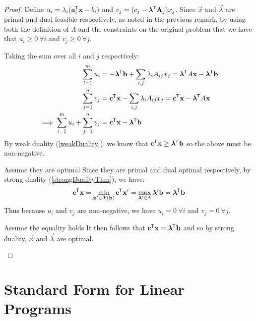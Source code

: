 \documentclass[../main.tex]{subfiles}
\begin{document}
\begin{proof}
  Define $u_i = \lambda_i(\mathbf{\bm{a}}^{{\mkern-1.5mu\mathsf{T}}}_i \mathbf{\bm{x}} - b_i)$ and $v_j = (c_j - \mathbf{\bm{\lambda}}^{{\mkern-1.5mu\mathsf{T}}} \mathbf{\bm{A}}_j)x_j$.
  Since $\vec{x}$ and $\vec{\lambda}$ are primal and dual feasible respectively, as noted in the previous remark, by using both the definition of $\Lambda$ and the constraints on the original problem that we have that $u_i \geq 0\ \forall i$ and $v_j \geq 0\ \forall j$.

  Taking the sum over all $i$ and $j$ respectively:
  \begin{align*}
    \sum_{i = 1}^{m} u_i &= - \mathbf{\bm{\lambda}}^{{\mkern-1.5mu\mathsf{T}}} \mathbf{\bm{b}} + \sum_{i, j} \lambda_i A_{i j} x_j  = \mathbf{\bm{\lambda}}^{{\mkern-1.5mu\mathsf{T}}} A \mathbf{\bm{x}} - \mathbf{\bm{\lambda}}^{{\mkern-1.5mu\mathsf{T}}} \mathbf{\bm{b}} \\
    \sum_{j = 1}^{n} v_j &= \mathbf{\bm{c}}^{{\mkern-1.5mu\mathsf{T}}} \mathbf{\bm{x}} - \sum_{i, j} \lambda_i A_{i j} x_j = \mathbf{\bm{c}}^{{\mkern-1.5mu\mathsf{T}}} \mathbf{\bm{x}} - \mathbf{\bm{\lambda}}^{{\mkern-1.5mu\mathsf{T}}} A\mathbf{\bm{x}} \\
    \implies \sum_{i = 1}^{m} u_i + \sum_{j = 1}^{n} v_j &= \mathbf{\bm{c}}^{{\mkern-1.5mu\mathsf{T}}} \mathbf{\bm{x}} - \mathbf{\bm{\lambda}}^{{\mkern-1.5mu\mathsf{T}}} \mathbf{\bm{b}}
  \end{align*}
  By weak duality (\cref{weakDuality}), we know that $\mathbf{\bm{c}}^{{\mkern-1.5mu\mathsf{T}}} \mathbf{\bm{x}} \geq \mathbf{\bm{\lambda}}^{{\mkern-1.5mu\mathsf{T}}} \mathbf{\bm{b}}$ so the above must be non-negative.
  \begin{proofdirection}{Assume they are optimal}
    Since they are primal and dual optimal respectively, by strong duality (\cref{strongDualityThm}), we have:
    \[
      \mathbf{\bm{c}}^{{\mkern-1.5mu\mathsf{T}}} \mathbf{\bm{x}} = \min_{\mathbf{\bm{x}}' \in \mathcal{X}(\mathbf{\bm{b}})} \mathbf{\bm{c}}^{{\mkern-1.5mu\mathsf{T}}} \mathbf{\bm{x}}' =  \max_{\mathbf{\bm{\lambda}}' \in \Lambda} \mathbf{\bm{\lambda}}' \mathbf{\bm{b}} = \mathbf{\bm{\lambda}}^{{\mkern-1.5mu\mathsf{T}}} \mathbf{\bm{b}}
    \]
    Thus because $u_i$ and $v_j$ are non-negative, we have $u_i = 0\ \forall i$ and $v_j = 0\ \forall j$.
  \end{proofdirection}
  \begin{proofdirection}{Assume the equality holds}
    It then follows that $\mathbf{\bm{c}}^{{\mkern-1.5mu\mathsf{T}}} \mathbf{\bm{x}} = \mathbf{\bm{\lambda}}^{{\mkern-1.5mu\mathsf{T}}} \mathbf{\bm{b}}$ and so by strong duality, $\vec{x}$ and $\vec{\lambda}$ are optimal.
  \end{proofdirection}
\end{proof}
\section{Standard Form for Linear Programs}
\end{document}
